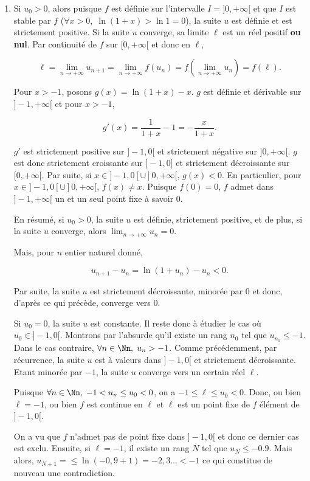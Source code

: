 {{\begin{enumerate}
\item  Si $u_0>0$, alors puisque $f$ est définie sur l'intervalle $I=]0,+\infty[$ et que $I$ est stable par $f$ ($\forall x>0,\;\ln(1+x)>\ln1=0$), la suite $u$ est définie et est strictement positive. Si la suite $u$ converge, sa limite $\ell$ est un réel positif \textbf{ou nul}. Par continuité de $f$ sur $[0,+\infty[$ et donc en $\ell$,

$$\ell=\lim_{n\rightarrow +\infty}u_{n+1}=\lim_{n\rightarrow +\infty}f(u_n)=f(\lim_{n\rightarrow +\infty}u_n)=f(\ell).$$

Pour $x>-1$, posons $g(x)=\ln(1+x)-x$. $g$ est définie et dérivable sur $]-1,+\infty[$ et pour $x>-1$,

$$g'(x)=\frac{1}{1+x}-1=-\frac{x}{1+x}.$$

$g'$ est strictement positive sur $]-1,0[$ et strictement négative sur $]0,+\infty[$. $g$ est donc strictement croissante sur $]-1,0]$ et strictement décroissante sur $[0,+\infty[$. Par suite, si $x\in]-1,0[\cup]0,+\infty[$, $g(x)<0$. En particulier, pour $x\in]-1,0[\cup]0,+\infty[$, $f(x)\neq x$. Puisque $f(0)=0$, $f$ admet dans $]-1,+\infty[$ un et un seul point fixe à savoir $0$.

En résumé, si $u_0>0$, la suite $u$ est définie, strictement positive, et de plus, si la suite $u$ converge, alors $\lim_{n\rightarrow +\infty}u_n=0$.

Mais, pour $n$ entier naturel donné,

$$u_{n+1}-u_n=\ln(1+u_n)-u_n<0.$$

Par suite, la suite $u$ est strictement décroissante, minorée par $0$ et donc, d'après ce qui précède, converge vers $0$.

Si $u_0=0$, la suite $u$ est constante. Il reste donc à étudier le cas où $u_0\in]-1,0[$. Montrons par l'absurde qu'il existe un rang $n_0$ tel que $u_{n_0}\leq-1$. Dans le cas contraire, $\forall n\in\Nn,\;u_n>-1$. Comme précédemment, par récurrence, la suite $u$ est à valeurs dans $]-1,0[$ et strictement décroissante. Etant minorée par $-1$, la suite $u$ converge vers un certain réel $\ell$.

Puisque $\forall n\in\Nn,\;-1<u_n\leq u_0<0$, on a $-1\leq\ell\leq u_0<0$. Donc, ou bien $\ell=-1$, ou bien $f$ est continue en $\ell$ et $\ell$ est un point fixe de $f$ élément de $]-1,0[$.

On a vu que $f$ n'admet pas de point fixe dans $]-1,0[$ et donc ce dernier cas est exclu. Ensuite, si $\ell=-1$, il existe un rang $N$ tel que $u_N\leq -0.9$. Mais alors, $u_{N+1}=\leq\ln(-0,9+1)=-2,3...<-1$ ce qui constitue de nouveau une contradiction.


\end{enumerate}}}
